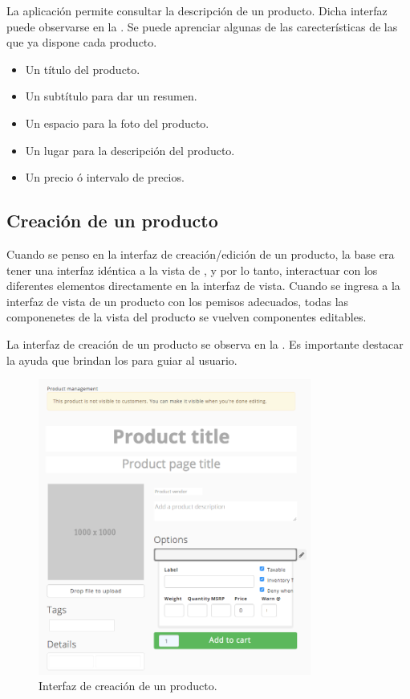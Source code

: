 		La aplicación permite consultar la descripción de un producto. Dicha interfaz puede observarse en la . Se puede aprenciar algunas de las carecterísticas de las que ya dispone cada producto.

		\begin{itemize}
			\item
				Un título del producto.
			\item
				Un subtítulo para dar un resumen.
			\item
				Un espacio para la foto del producto.
			\item
				Un lugar para la descripción del producto.
			\item
				Un precio ó intervalo de precios.
		\end{itemize}

	\subsection{Creación de un producto}

		Cuando se penso en la interfaz de creación/edición de un producto, la base era tener una interfaz idéntica a la vista de , y por lo tanto, interactuar con los diferentes elementos directamente en la interfaz de vista.
		Cuando se ingresa a la interfaz de vista de un producto con los pemisos adecuados, todas las componenetes de la vista del producto se vuelven componentes editables.

		La interfaz de creación de un producto se observa en la . Es importante destacar la ayuda que brindan los \placeholdersINT para guiar al usuario.

		\begin{figure}[H]
			\centering
			\includegraphics[width=0.8\textwidth]{figuras/solution/product/create/form.png}

			\caption{Interfaz de creación de un producto.}
			\label{figure:solution:product:create:form}
		\end{figure}


